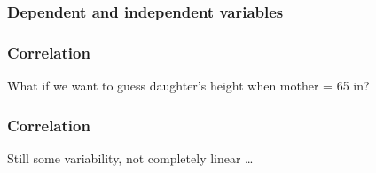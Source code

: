 \documentclass[handout]{beamer}
\begin{document}


   \begin{frame}
   \frametitle{Dependent and independent variables}
   \begin{center}
   \end{center}

   \end{frame}



   \begin{frame}
   \frametitle{Correlation}
   \begin{center}
   \end{center}
   What if we want to guess daughter's height when mother = 65 in?
   \end{frame}



   \begin{frame}
   \frametitle{Correlation}
   \begin{center}
   \end{center}
   Still some variability, not completely linear \dots
   \end{frame}
\end{document}
